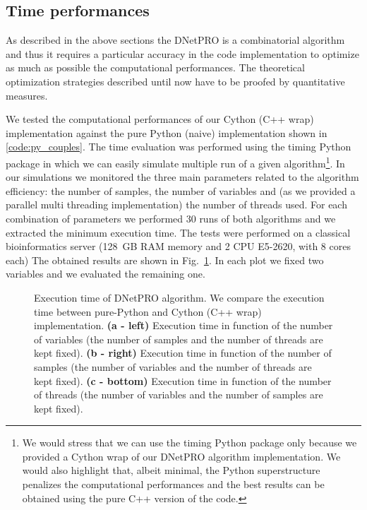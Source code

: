 \documentclass{standalone}
\begin{document}
\subsection[Time performances]{Time performances}\label{implementation:timing}

As described in the above sections the DNetPRO is a combinatorial algorithm and thus it requires a particular accuracy in the code implementation to optimize as much as possible the computational performances.
The theoretical optimization strategies described until now have to be proofed by quantitative measures.

We tested the computational performances of our Cython (C++ wrap) implementation against the pure Python (naive) implementation shown in \ref{code:py_couples}.
The time evaluation was performed using the \textsf{timing} Python package in which we can easily simulate multiple run of a given algorithm\footnote{
  We would stress that we can use the \textsf{timing} Python package only because we provided a Cython wrap of our DNetPRO algorithm implementation.
  We would also highlight that, albeit minimal, the Python superstructure penalizes the computational performances and the best results can be obtained using the pure C++ version of the code.
}.
In our simulations we monitored the three main parameters related to the algorithm efficiency: the number of samples, the number of variables and (as we provided a parallel multi threading implementation) the number of threads used.
For each combination of parameters we performed 30 runs of both algorithms and we extracted the minimum execution time.
The tests were performed on a classical bioinformatics server (128~GB RAM memory and 2 CPU E5-2620, with 8 cores each)
The obtained results are shown in Fig.~\ref{fig:dnetpro_timing}.
In each plot we fixed two variables and we evaluated the remaining one.

\begin{figure}[htbp]
\def\svgwidth{0.4\textwidth}

\qquad\qquad
\centering
\def\svgwidth{0.4\textwidth}

\qquad\qquad
\centering
\def\svgwidth{0.5\textwidth}

\caption{Execution time of DNetPRO algorithm.
We compare the execution time between pure-Python and Cython (C++ wrap) implementation.
\textbf{(a - left)} Execution time in function of the number of variables (the number of samples and the number of threads are kept fixed).
\textbf{(b - right)} Execution time in function of the number of samples (the number of variables and the number of threads are kept fixed).
\textbf{(c - bottom)} Execution time in function of the number of threads (the number of variables and the number of samples are kept fixed).
}
\label{fig:dnetpro_timing}
\end{figure}
\end{document}

